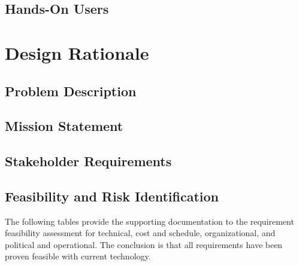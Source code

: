 \subsection{Hands-On Users} \label{ssec:hands_on_users}

\section{Design Rationale} \label{sec:design_rationale}

\subsection{Problem Description} \label{ssec:problem_desc}

\subsection{Mission Statement} \label{ssec:mission_statement}

\subsection{Stakeholder Requirements} \label{ssec:stakeholder_reqs}


\subsection{Feasibility and Risk Identification} \label{ssec:feasibility_risk}
The following tables provide the supporting documentation to the requirement feasibility assessment for technical, cost and schedule, organizational, and political and operational. The conclusion is that all requirements have been proven feasible with current technology.


